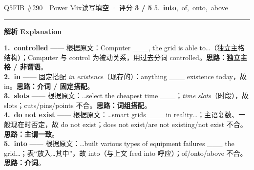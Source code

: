 \documentclass[11pt]{article}
\newcommand{\ptesub}[1]{%
  \par\needspace{2\baselineskip}\smallskip
  {\color{cAccent}\rule[-0.2ex]{3pt}{1.05em}}\hspace{6pt}%
  {\bfseries\color{cHead}#1}\par\nopagebreak\smallskip}
\begin{document}
\begin{qblock}{Q5\quad FIB \#290\ \ Power Mix}{读写填空 · 评分 \textcolor{cAccent}{\bfseries 3 / 5}}
{5.\ \textbf{into},\ of,\ onto,\ above}
\ptesub{解析 Explanation}
\begin{notebox}\footnotesize
\textbf{1.\ controlled} —— 根据原文：Computer \_\_\_, the grid is able to…（独立主格结构）；Computer 与 control 为被动关系，用过去分词 controlled。\textbf{思路：独立主格 / 非谓语}。\\[2pt]
\textbf{2.\ in} —— 固定搭配 \emph{in existence}（现存的）：anything \_\_\_ existence today，故 in。\textbf{思路：介词 / 固定搭配}。\\[2pt]
\textbf{3.\ slots} —— 根据原文：…select the cheapest time \_\_\_；\emph{time slots}（时段），故 slots；cuts/pins/points 不合。\textbf{思路：词组搭配}。\\[2pt]
\textbf{4.\ do not exist} —— 根据原文：…smart grids \_\_\_ in reality…；主语复数、一般现在时否定，故 do not exist；does not exist/are not existing/not exist 不合。\textbf{思路：主谓一致}。\\[2pt]
\textbf{5.\ into} —— 根据原文：…built various types of equipment failures \_\_\_ the grid…；表“放入…其中”，故 into（与上文 feed into 呼应）；of/onto/above 不合。\textbf{思路：介词}。
\end{notebox}
\end{qblock}
\end{document}
